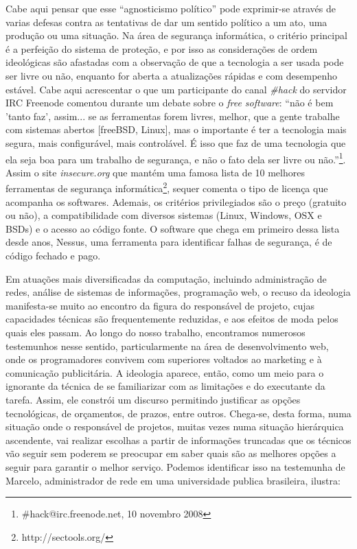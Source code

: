 Cabe aqui pensar que esse “agnosticismo político” pode exprimir-se através de varias defesas contra as tentativas de dar um sentido político a um ato, uma produção ou uma situação. Na área de segurança informática, o critério principal é a perfeição do sistema de proteção, e por isso as considerações de ordem ideológicas são afastadas com a observação de que a tecnologia a ser usada pode ser livre ou não, enquanto for aberta a atualizações rápidas e com desempenho estável. Cabe aqui acrescentar o que um participante do canal \emph{\#hack} do servidor IRC Freenode comentou durante um debate sobre o \emph{free software}: “não é bem 'tanto faz', assim... se as ferramentas forem livres, melhor, que a gente trabalhe com sistemas abertos [freeBSD, Linux], mas o importante é ter a tecnologia mais segura, mais configurável, mais controlável. É isso que faz de uma tecnologia que ela seja boa para um trabalho de segurança, e não o fato dela ser livre ou não.”\footnote{\#hack@irc.freenode.net, 10 novembro 2008}. Assim o site \emph{insecure.org} que mantém uma famosa lista de 10 melhores ferramentas de segurança informática\footnote{http://sectools.org/}, sequer comenta o tipo de licença que acompanha os softwares. Ademais, os critérios privilegiados são o preço (gratuito ou não), a compatibilidade com diversos sistemas (Linux, Windows, OSX e BSDs) e o acesso ao código fonte. O software que chega em primeiro dessa lista desde anos, Nessus, uma ferramenta para identificar falhas de segurança, é de código fechado e pago.

Em atuações mais diversificadas da computação, incluindo administração de redes, análise de sistemas de informações, programação web, o recuso da ideologia manifesta-se muito ao encontro da figura do responsável de projeto, cujas capacidades técnicas são frequentemente reduzidas, e aos efeitos de moda pelos quais eles passam. Ao longo do nosso trabalho, encontramos numerosos testemunhos nesse sentido, particularmente na área de desenvolvimento web, onde os programadores convivem com superiores voltados ao marketing e à comunicação publicitária. A ideologia aparece, então, como um meio para o ignorante da técnica de se familiarizar com as limitações e do executante da tarefa. Assim, ele constrói um discurso permitindo justificar as opções tecnológicas, de orçamentos, de prazos, entre outros. Chega-se, desta forma, numa situação onde o responsável de projetos, muitas vezes numa situação hierárquica ascendente, vai realizar escolhas a partir de informações truncadas que os técnicos vão seguir sem poderem se preocupar em saber quais são as melhores opções a seguir para garantir o melhor serviço. Podemos identificar isso na testemunha de Marcelo, administrador de rede em uma universidade publica brasileira, ilustra:

